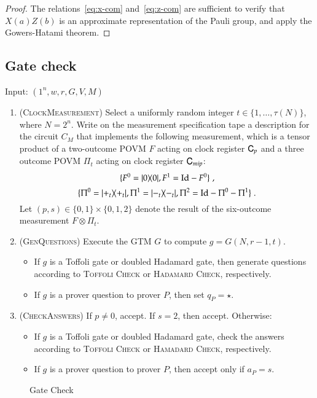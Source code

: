 \begin{proof}
The relations~\eqref{eq:x-com} and~\eqref{eq:z-com} are sufficient to verify that $X(a)Z(b)$ is an approximate representation of the Pauli group, and apply the Gowers-Hatami theorem.
\end{proof}



\subsection{Gate check}
\label{sec:prop_check}


\vspace{10pt}
\begin{center}
\begin{mdframed}
    Input: $(1^n,w,r,G,V,M)$
	\begin{enumerate}
		\item (\textsc{ClockMeasurement}) Select a uniformly random integer $t\in\{1,\ldots, \tau(N)\}$, where $N = 2^n$. Write on the measurement specification tape a description for the circuit $C_M$ that implements the following measurement, which is a tensor product of a two-outcome POVM $F$ acting on clock register ${\textsf{C}}_p$ and a three outcome POVM $\Pi_t$ acting on clock register ${\textsf{C}}_{mip}$: 
\[
	\{F^0 = |0\rangle\! \langle 0|, F^1 = \mathop{\mathrm{Id}}\!\mathinner{} - F^0 \}\;,
\]
\[
	\{ 	\Pi^0 = |+_t\rangle\! \langle +_t|, 
	\Pi^1 = |-_t\rangle\! \langle -_t|, 
	\Pi^2 = \mathop{\mathrm{Id}}\!\mathinner{} - \Pi^0 - \Pi^1 \}\;.
\]	
Let $(p,s) \in \{0,1\} \times \{0,1,2\}$ denote the result of the six-outcome measurement $F \otimes \Pi_t$.

	\item (\textsc{GenQuestions}) Execute the GTM $G$ to compute $g = G(N,r-1,t)$. 
	\begin{itemize}
		\item If $g$ is a Toffoli gate or doubled Hadamard gate, then generate questions according to \textsc{Toffoli Check} or \textsc{Hadamard Check}, respectively. 
		\item If $g$ is a prover question to prover $P$, then set $q_P = \star$.
	\end{itemize}
		\item (\textsc{CheckAnswers}) If $p \neq 0$, accept. If $s = 2$, then accept. Otherwise:
		\begin{itemize}
			\item If $g$ is a Toffoli gate or doubled Hadamard gate, check the answers according to \textsc{Toffoli Check} or \textsc{Hamadard Check}, respectively. 
			\item If $g$ is a prover question to prover $P$, then accept only if $a_P = s$. 
		\end{itemize}
	\end{enumerate}    
\end{mdframed}

\end{center}
\begin{figure}[H]
\caption{Gate Check}
\label{fig:prop_check}
\end{figure}

